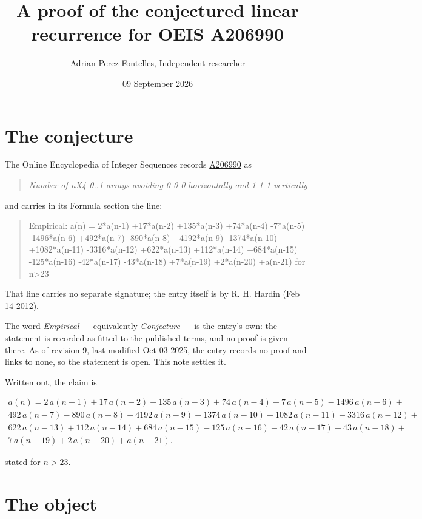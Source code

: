 \documentclass[11pt]{article}
\title{A proof of the conjectured linear recurrence for OEIS A206990}
\author{Adrian Perez Fontelles, Independent researcher}
\date{09 September 2026}
\theoremstyle{definition}
\begin{document}
\maketitle
\section{The conjecture}

The Online Encyclopedia of Integer Sequences records \href{https://oeis.org/A206990}{A206990} as

\begin{quote}\itshape Number of nX4 0..1 arrays avoiding 0 0 0 horizontally and 1 1 1 vertically\end{quote}

and carries in its Formula section the line:

\begin{quote}\ttfamily Empirical: a(n) = 2*a(n-1) +17*a(n-2) +135*a(n-3) +74*a(n-4) -7*a(n-5) -1496*a(n-6) +492*a(n-7) -890*a(n-8) +4192*a(n-9) -1374*a(n-10) +1082*a(n-11) -3316*a(n-12) +622*a(n-13) +112*a(n-14) +684*a(n-15) -125*a(n-16) -42*a(n-17) -43*a(n-18) +7*a(n-19) +2*a(n-20) +a(n-21) for n>23\end{quote}

That line carries no separate signature; the entry itself is by R. H. Hardin (Feb 14 2012).

The word {\itshape Empirical} --- equivalently {\itshape Conjecture} --- is the entry's own: the statement is recorded as fitted to the published terms, and no proof is given there. As of revision 9, last modified Oct 03 2025, the entry records no proof and links to none, so the statement is open. This note settles it.

Written out, the claim is

\begin{multline*} a(n) = 2\,a(n-1) + 17\,a(n-2) + 135\,a(n-3) + 74\,a(n-4) - 7\,a(n-5) - 1496\,a(n-6) + \\ 492\,a(n-7) - 890\,a(n-8) + 4192\,a(n-9) - 1374\,a(n-10) + 1082\,a(n-11) - 3316\,a(n-12) + \\ 622\,a(n-13) + 112\,a(n-14) + 684\,a(n-15) - 125\,a(n-16) - 42\,a(n-17) - 43\,a(n-18) + \\ 7\,a(n-19) + 2\,a(n-20) + a(n-21). \end{multline*}

stated for $n > 23$.

\section{The object}
\end{document}
